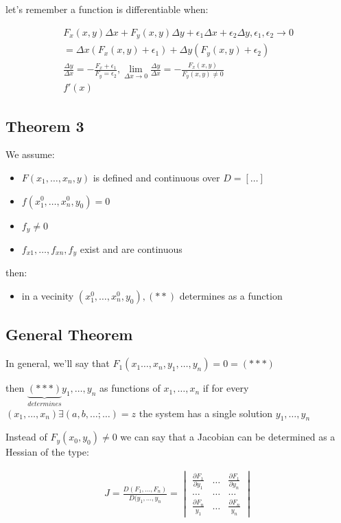 \documentclass[11pt,fleqn]{book} %
\begin{document}
let's remember a function is differentiable when:

\begin{gather}
    F_x (x,y) \Delta x + F_y (x,y) \Delta y + \epsilon_1 \Delta x + \epsilon_2 \Delta y, \epsilon_1, \epsilon_2 \rightarrow 0 \\
    = \Delta x (F_x(x,y) + \epsilon_1) + \Delta y (F_y (x,y)+ \epsilon_2) \\
    \frac{\Delta y}{\Delta x} = - \frac{F_x + \epsilon_1}{F_y = \epsilon_2}, \lim_{\Delta x \to 0} \frac{\Delta y}{\Delta x} = - \frac{F_x(x,y)}{F_y(x,y) \neq 0}\\
    f'(x)
\end{gather}

\subsection{Theorem 3}

We assume:
\begin{itemize}
    \item $F(x_1,\dots,x_n, y)$ is defined and continuous over $D = [\dots]$
    \item $f(x_1^0,\dots,x_n^0,y_0) = 0$ \\
    \item $f_y \neq 0$
    \item $f_{x1}, \dots, f_{xn}, f_y$ exist and are continuous
\end{itemize}

then:

\begin{itemize}
    \item in a vecinity $(x_1^0, \dots, x_n^0, y_0),(**)$ determines as a function
\end{itemize}

\subsection{General Theorem}

In general, we'll say that $F_1(x_1 \dots, x_n, y_1, \dots, y_n) = 0 = (***)$

then $\underbrace{(***)}_{determines} y_1, \dots, y_n$ as functions of  $x_1, \dots, x_n$ 
if for every $(x_1, \dots, x_n) \exists (a,b, \dots; \dots) = z$ the system has a single solution
$y_1, \dots, y_n$

Instead of $F_y (x_0, y_0) \neq 0$ we can say that a Jacobian can be determined as a Hessian of the type:

\begin{gather}
    J = \frac{D(F_1, \dots, F_n)}{D(y_1, \dots, y_n} = \begin{vmatrix}
        \frac{\partial F_1}{\partial y_1} & \dots & \frac{\partial F_1}{\partial y_n} \\
        \dots & \dots & \dots \\
        \frac{\partial F_n}{y_1} & \dots & \frac{\partial F_n}{y_n} 
    \end{vmatrix}
\end{gather}
\end{document}
